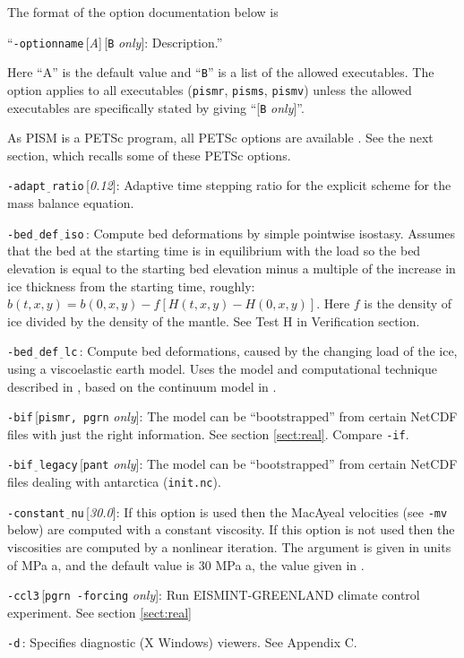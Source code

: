 \documentclass[11pt,final]{amsart}
\renewcommand{\t}[1]{\texttt{#1}}
\newcommand{\rawopt}[1]{\vspace{1mm}\noindent \Large\texttt{-#1}\normalsize}
\newcommand{\opt}[1]{\rawopt{#1}\,:\quad}
\newcommand{\optdef}[2]{\rawopt{#1}\,[\textsl{#2}]:\quad}
\newcommand{\optrestrict}[2]{\rawopt{#1}\,[\texttt{#2} \textsl{only}]:\quad}
\newcommand{\optdefrestrict}[3]{\rawopt{#1}\,[\textsl{#2}]\,[\texttt{#3} \textsl{only}]:\quad}
\newcommand{\und}{$\underline{\,\,\,}$}
\begin{document}
The format of the option documentation below is

\centerline{``\optdefrestrict{optionname}{A}{B} Description.''}

\noindent Here ``A'' is the default value and ``\t{B}'' is a list of the allowed executables.  The option applies to all executables (\verb|pismr|, \verb|pisms|, \verb|pismv|) unless the allowed executables are specifically stated by giving ``[\t{B} \textsl{only}]''.

As PISM is a PETSc program, all PETSc options are available \cite{petsc-user-ref}.  See the next section, which recalls some of these PETSc options.
\bigskip

\optdef{adapt\und ratio}{0.12}  Adaptive time stepping ratio for the explicit scheme for the mass balance equation.

\opt{bed\und def\und iso} Compute bed deformations by simple pointwise isostasy.  Assumes that the bed at the starting time is in equilibrium with the load so the bed elevation is equal to the starting bed elevation minus a multiple of the increase in ice thickness from the starting time, roughly: $b(t,x,y) = b(0,x,y) - f [H(t,x,y) - H(0,x,y)]$.  Here $f$ is the density of ice divided by the density of the mantle.  See Test H in Verification section.

\opt{bed\und def\und lc} Compute bed deformations, caused by the changing load of the ice, using a viscoelastic earth model.  Uses the model and computational technique described in \cite{BLKfastearth}, based on the continuum model in \cite{LingleClark}.

\optrestrict{bif}{pismr, pgrn}  The model can be ``bootstrapped'' from certain NetCDF files with just the right information.  See section \ref{sect:real}.  Compare \verb|-if|.

\optrestrict{bif\und legacy}{pant}  The model can be ``bootstrapped'' from certain NetCDF files dealing with antarctica (\verb|init.nc|).

\optdef{constant\und nu}{30.0}  If this option is used then the MacAyeal velocities (see \verb|-mv| below) are computed with a constant viscosity.  If this option is not used then the viscosities are computed by a nonlinear iteration.  The argument is given in units of MPa a, and the default value is $30$ MPa a, the value given in \cite{Ritzetal2001}.

\optrestrict{ccl3}{pgrn -forcing}    Run EISMINT-GREENLAND climate control experiment. See section \ref{sect:real}

\opt{d}  Specifies diagnostic (X Windows) viewers.  See Appendix C.
\end{document}
